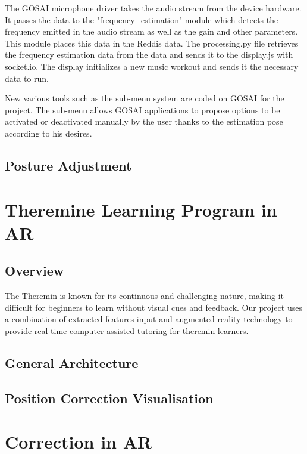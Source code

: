 The GOSAI microphone driver takes the audio stream from the device hardware. It passes the data to the "frequency\_estimation" module which detects the frequency emitted in the audio stream as well as the gain and other parameters. This module places this data in the Reddis data. The processing.py file retrieves the frequency estimation data from the data and sends it to the display.js with socket.io. The display initializes a new music workout and sends it the necessary data to run.

New various tools such as the sub-menu system are coded on GOSAI for the project. The sub-menu allows GOSAI applications to propose options to be activated or deactivated manually by the user thanks to the estimation pose according to his desires.

\subsection{Posture Adjustment}



\section{Theremine Learning Program in AR}

\subsection{Overview}

The Theremin is known for its continuous and challenging nature, making it difficult for beginners to learn without visual cues and feedback. Our project uses a combination of extracted features input and augmented reality technology to provide real-time computer-assisted tutoring for theremin learners.

\subsection{General Architecture}


\subsection{Position Correction Visualisation}



\section{Correction in AR}



